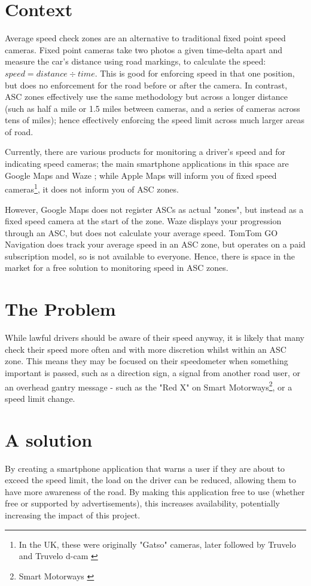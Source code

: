 \documentclass[11pt, a4paper, notitlepage]{report}
\begin{document}
\section{Context}\label{sec:Context}
Average speed check zones are an alternative to traditional fixed point speed cameras. Fixed point cameras take two photos a given time-delta apart and measure the car's distance using road markings, to calculate the speed: $ speed = distance \div time $. This is good for enforcing speed in that one position, but does no enforcement for the road before or after the camera. In contrast, ASC zones effectively use the same methodology but across a longer distance (such as half a mile or 1.5 miles between cameras, and a series of cameras across tens of miles); hence effectively enforcing the speed limit across much larger areas of road.

Currently, there are various products for monitoring a driver's speed and for indicating speed cameras; the main smartphone applications in this space are Google Maps \citep{googleMaps} and Waze \citep{waze}; while Apple Maps \citep{appleMaps} will inform you of fixed speed cameras\footnote{In the UK, these were originally "Gatso" cameras, later followed by Truvelo and Truvelo d-cam \citep{dcam}}, it does not inform you of ASC zones.

However, Google Maps does not register ASCs as actual "zones", but instead as a fixed speed camera at the start of the zone. Waze displays your progression through an ASC, but does not calculate your average speed. TomTom GO Navigation \citep{tomtomGo} does track your average speed in an ASC zone, but operates on a paid subscription model, so is not available to everyone. Hence, there is space in the market for a free solution to monitoring speed in ASC zones.
\section{The Problem}
While lawful drivers should be aware of their speed anyway, it is likely that many check their speed more often and with more discretion whilst within an ASC zone. This means they may be focused on their speedometer when something important is passed, such as a direction sign, a signal from another road user, or an overhead gantry message - such as the "Red X" on Smart Motorways\footnote{Smart Motorways \citep{SmartMotorways}}, or a speed limit change. 
\section{A solution}
By creating a smartphone application that warns a user if they are about to 
exceed the speed limit, the load on the driver can be reduced, allowing them to 
have more awareness of the road. By making this application free to use 
(whether free or supported by advertisements), this increases availability, 
potentially increasing the impact of this project.
\end{document}

